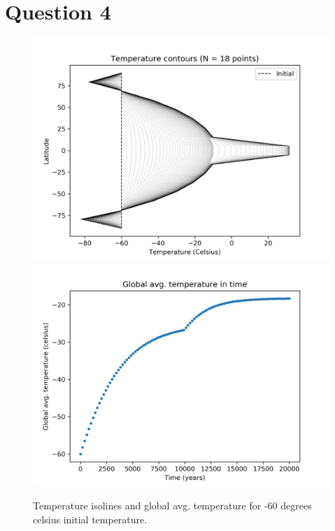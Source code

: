 \documentclass{article}
\begin{document}
\section*{Question 4}
\begin{figure}
\includegraphics[scale=0.7]{tcont_q4.png} 
\includegraphics[scale=0.7]{tavg_q4.png}
\caption{Temperature isolines and global avg. temperature for -60 degrees celsius initial temperature.}
\end{figure}
\end{document}
